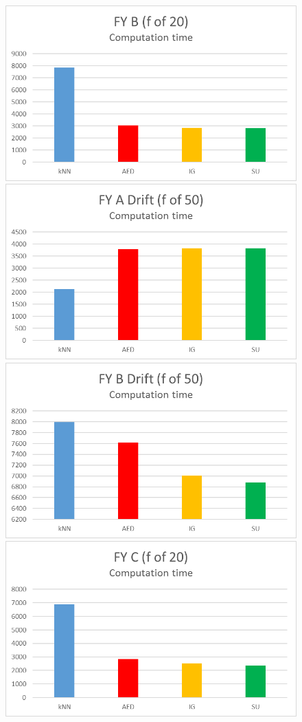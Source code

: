 \begin{figure}[h]
\begin{center}
\includegraphics[scale=0.17]{Graphs/FY_B/time20}
\includegraphics[scale=0.17]{Graphs/FY_A_Drift/time}
\includegraphics[scale=0.17]{Graphs/FY_B_Drift/time}
\includegraphics[scale=0.17]{Graphs/FY_C/time20}

\end{center}
\end{figure}
